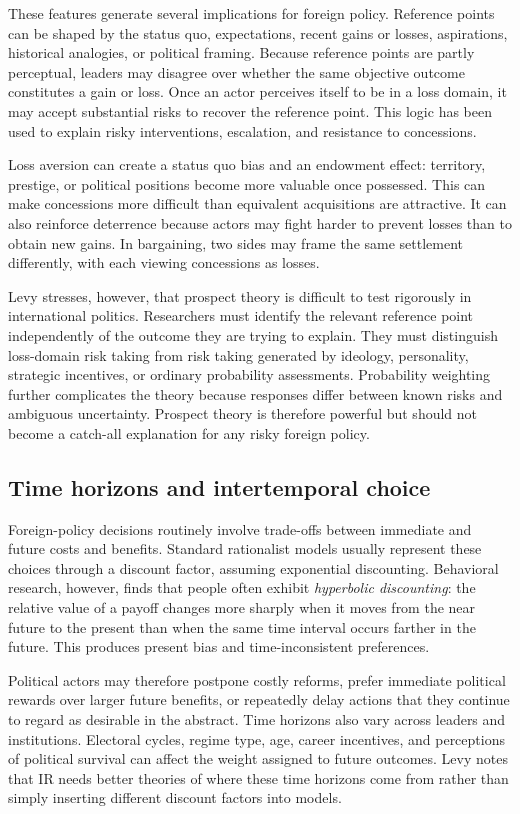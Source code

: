These features generate several implications for foreign policy. Reference points can be shaped by the status quo, expectations, recent gains or losses, aspirations, historical analogies, or political framing. Because reference points are partly perceptual, leaders may disagree over whether the same objective outcome constitutes a gain or loss. Once an actor perceives itself to be in a loss domain, it may accept substantial risks to recover the reference point. This logic has been used to explain risky interventions, escalation, and resistance to concessions.

Loss aversion can create a status quo bias and an endowment effect: territory, prestige, or political positions become more valuable once possessed. This can make concessions more difficult than equivalent acquisitions are attractive. It can also reinforce deterrence because actors may fight harder to prevent losses than to obtain new gains. In bargaining, two sides may frame the same settlement differently, with each viewing concessions as losses.

Levy stresses, however, that prospect theory is difficult to test rigorously in international politics. Researchers must identify the relevant reference point independently of the outcome they are trying to explain. They must distinguish loss-domain risk taking from risk taking generated by ideology, personality, strategic incentives, or ordinary probability assessments. Probability weighting further complicates the theory because responses differ between known risks and ambiguous uncertainty. Prospect theory is therefore powerful but should not become a catch-all explanation for any risky foreign policy.

\subsection{Time horizons and intertemporal choice}

Foreign-policy decisions routinely involve trade-offs between immediate and future costs and benefits. Standard rationalist models usually represent these choices through a discount factor, assuming exponential discounting. Behavioral research, however, finds that people often exhibit \emph{hyperbolic discounting}: the relative value of a payoff changes more sharply when it moves from the near future to the present than when the same time interval occurs farther in the future. This produces present bias and time-inconsistent preferences.

Political actors may therefore postpone costly reforms, prefer immediate political rewards over larger future benefits, or repeatedly delay actions that they continue to regard as desirable in the abstract. Time horizons also vary across leaders and institutions. Electoral cycles, regime type, age, career incentives, and perceptions of political survival can affect the weight assigned to future outcomes. Levy notes that IR needs better theories of where these time horizons come from rather than simply inserting different discount factors into models.

